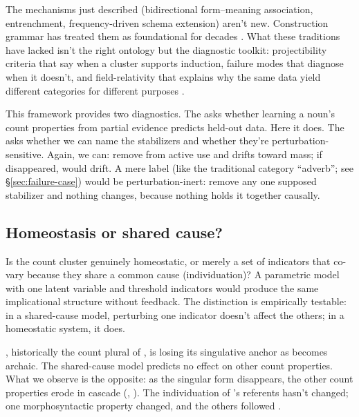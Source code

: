 \documentclass[12pt,a4paper]{article}
\begin{document}
The mechanisms just described (bidirectional form--meaning association, entrenchment, frequency-driven schema extension) aren't new. Construction grammar has treated them as foundational for decades \citep{goldberg1995constructions,langacker1987foundations,bybee2010}. What these traditions have lacked isn't the right ontology but the diagnostic toolkit: projectibility criteria that say when a cluster supports induction, failure modes that diagnose when it doesn't, and field-relativity that explains why the same data yield different categories for different purposes \citep{reynolds2025stack}.

This framework provides two diagnostics. The  asks whether learning a noun's count properties from partial evidence predicts held-out data. Here it does. The  asks whether we can name the stabilizers and whether they're perturbation-sensitive. Again, we can: remove  from active use and  drifts toward mass; if  disappeared,  would drift. A mere label (like the traditional category \enquote{adverb}; see \S\ref{sec:failure-case}) would be perturbation-inert: remove any one supposed stabilizer and nothing changes, because nothing holds it together causally.

\subsection{Homeostasis or shared cause?}

Is the count cluster genuinely homeostatic, or merely a set of indicators that co-vary because they share a common cause (individuation)? A parametric model with one latent variable and threshold indicators would produce the same implicational structure without feedback. The distinction is empirically testable: in a shared-cause model, perturbing one indicator doesn't affect the others; in a homeostatic system, it does.

, historically the count plural of , is losing its singulative anchor as  becomes archaic. The shared-cause model predicts no effect on other count properties. What we observe is the opposite: as the singular form disappears, the other count properties erode in cascade (, ). The individuation of 's referents hasn't changed; one morphosyntactic property changed, and the others followed \citep{garner2016}.
\end{document}
